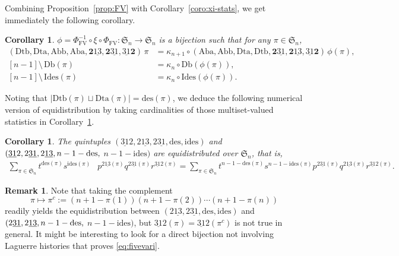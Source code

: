 \documentclass[12pt]{amsart}
\numberwithin{equation}{section}
\theoremstyle{plain}
\newtheorem{corollary}[theorem]{Corollary}
\theoremstyle{definition}
\newtheorem{remark}[theorem]{Remark}
\def\FV{\mathrm{FV}}
\def\SS{\mathfrak{S}}
\def\des{\mathrm{des}}
\def\ides{\mathrm{ides}}
\def\Db{\mathrm{Db}}
\def\Id{\mathrm{Ides}}
\def\Dtb{\mathrm{Dtb}}
\def\Dta{\mathrm{Dta}}
\def\Abb{\mathrm{Abb}}
\def\Aba{\mathrm{Aba}}
\def\pprs{\mathrm{2\underline{13}}}
\def\ppwrs{\mathrm{2\underline{31}}}
\def\pp31-2{\mathrm{\underline{31}2}}
\def\rightascent{{\mathbf{2}\underline{13}}}
\def\leftdescent{\mathrm{\underline{31}}\mathbf{2}}
\def\rightdescent{\mathrm{\mathbf{2}\underline{31}}}
\def\Mad{\mathrm{Mad}}
\def\Madl{\mathrm{Madl}}
\begin{document}
Combining Proposition~\ref{prop:FV} with Corollary~\ref{coro:xi-stats}, we get immediately the following corollary.

\begin{corollary}\label{coro:desbased}
$\phi=\Phi_{\FV}^{-1}\circ \xi \circ \Phi_{\FV}:\SS_n\to\SS_n$ is a bijection such that for any $\pi \in \SS_n$,
\begin{align*}
  (\Dtb,\Dta,\Abb,\Aba,\rightascent,\rightdescent,\leftdescent) \, \pi
&=\kappa_{n+1}\circ(\Aba,\Abb,\Dta,\Dtb,\rightdescent,\rightascent,\leftdescent) \, \phi(\pi),\\[4pt]
[n-1] \setminus\,  \Db(\pi) &=  \kappa_n\circ\Db(\phi(\pi)),\\[4pt]
  [n-1] \setminus\,  \Id(\pi) &=  \kappa_n\circ\Id(\phi(\pi)).
\end{align*}
\end{corollary}

Noting that $|\Dtb(\pi)\sqcup\Dta(\pi)|=\des(\pi)$, we deduce the following numerical version of equidistribution by taking cardinalities of those multiset-valued statistics in Corollary~\ref{coro:desbased}.
\begin{corollary}
The quintuples $(\pp31-2,\pprs,\ppwrs,\des,\ides)$ and $(\pp31-2,\ppwrs,\pprs,n-1-\des,\linebreak$
$n-1-\ides)$ are equidistributed over $\SS_n$, that is,
\begin{align}
\label{eq:fivevari}
\sum_{\pi \in \SS_n} t^{\des(\pi)} s^{\ides(\pi)}& p^{\pprs(\pi)} q^{\ppwrs(\pi)} r^{\pp31-2(\pi)}=\sum_{\pi \in \SS_n} t^{n-1-\des(\pi)} s^{n-1-\ides(\pi)} p^{\ppwrs(\pi)} q^{\pprs(\pi)} r^{\pp31-2(\pi)}.
\end{align}
\end{corollary}
\begin{remark}
Note that taking the complement $$\pi\mapsto\pi^{c}:=(n+1-\pi(1))(n+1-\pi(2))\cdots(n+1-\pi(n))$$ readily yields the equidistribution between $(\pprs,\ppwrs,\des,\ides)$ and $(\ppwrs,\pprs,n-1-\des,\linebreak$
$n-1-\ides)$, but $\pp31-2(\pi)=\pp31-2(\pi^c)$ is not true in general. It might be interesting to look for a direct bijection not involving Laguerre histories that proves \eqref{eq:fivevari}.
\end{remark}
\end{document}
